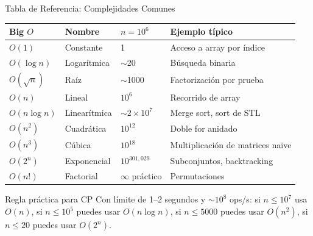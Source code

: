 \documentclass[aspectratio=169]{beamer}
\begin{document}
\begin{frame}{Tabla de Referencia: Complejidades Comunes}
    \begin{table}[]
        \centering
        \renewcommand{\arraystretch}{1.25}
        \scriptsize
        \begin{tabular}{l l l p{4.5cm}}
            \toprule
            \textbf{Big $O$} & \textbf{Nombre} & \textbf{$n=10^6$} & \textbf{Ejemplo típico} \\
            \midrule
            $O(1)$ & Constante & 1 & Acceso a array por índice \\
            $O(\log n)$ & Logarítmica & $\sim$20 & Búsqueda binaria \\
            $O(\sqrt{n})$ & Raíz & $\sim$1000 & Factorización por prueba \\
            $O(n)$ & Lineal & $10^6$ & Recorrido de array \\
            $O(n \log n)$ & Linearítmica & $\sim 2 \times 10^7$ & Merge sort, sort de STL \\
            $O(n^2)$ & Cuadrática & $10^{12}$ & Doble for anidado \\
            $O(n^3)$ & Cúbica & $10^{18}$ & Multiplicación de matrices naive \\
            $O(2^n)$ & Exponencial & $10^{301{,}029}$ & Subconjuntos, backtracking \\
            $O(n!)$ & Factorial & $\infty$ práctico & Permutaciones \\
            \bottomrule
        \end{tabular}
    \end{table}
    
    \vspace{0.2cm}
    \begin{block}{Regla práctica para CP}
        Con límite de 1--2 segundos y $\sim10^8$ ops/s: si $n \leq 10^7$ usa $O(n)$, si $n \leq 10^5$ puedes usar $O(n \log n)$, si $n \leq 5000$ puedes usar $O(n^2)$, si $n \leq 20$ puedes usar $O(2^n)$.
    \end{block}
\end{frame}
\end{document}
